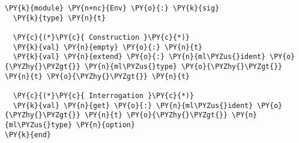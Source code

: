 \begin{Verbatim}[commandchars=\\\{\}]
\PY{k}{module} \PY{n+nc}{Env} \PY{o}{:} \PY{k}{sig}
  \PY{k}{type} \PY{n}{t}

  \PY{c}{(*}\PY{c}{ Construction }\PY{c}{*)}
  \PY{k}{val} \PY{n}{empty} \PY{o}{:} \PY{n}{t}
  \PY{k}{val} \PY{n}{extend} \PY{o}{:} \PY{n}{ml\PYZus{}ident} \PY{o}{\PYZhy{}\PYZgt{}} \PY{n}{ml\PYZus{}type} \PY{o}{\PYZhy{}\PYZgt{}} \PY{n}{t} \PY{o}{\PYZhy{}\PYZgt{}} \PY{n}{t}

  \PY{c}{(*}\PY{c}{ Interrogation }\PY{c}{*)}
  \PY{k}{val} \PY{n}{get} \PY{o}{:} \PY{n}{ml\PYZus{}ident} \PY{o}{\PYZhy{}\PYZgt{}} \PY{n}{t} \PY{o}{\PYZhy{}\PYZgt{}} \PY{n}{ml\PYZus{}type} \PY{n}{option}
\PY{k}{end}
\end{Verbatim}

